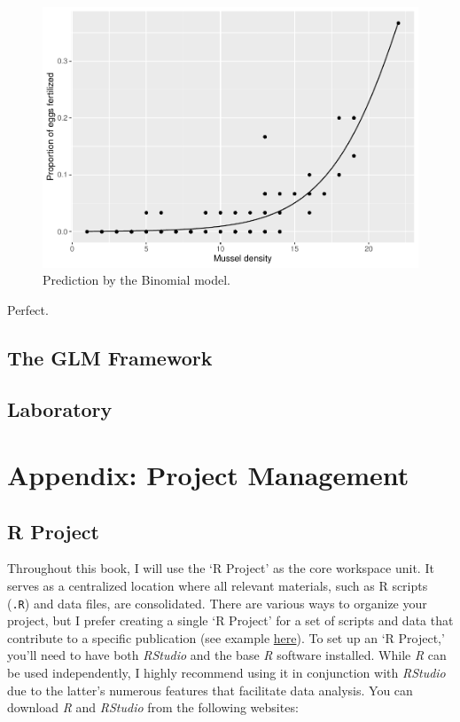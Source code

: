 \documentclass[
]{book}
\begin{document}
\begin{figure}

{\centering \includegraphics{_main_files/figure-latex/binom-fit-figure-1} 

}

\caption{Prediction by the Binomial model.}\label{fig:binom-fit-figure}
\end{figure}

Perfect.

\hypertarget{the-glm-framework}{%
\section{The GLM Framework}\label{the-glm-framework}}

\hypertarget{laboratory-7}{%
\section{Laboratory}\label{laboratory-7}}

\hypertarget{appendix-project-management}{%
\chapter{Appendix: Project Management}\label{appendix-project-management}}

\hypertarget{r-project}{%
\section{R Project}\label{r-project}}

Throughout this book, I will use the `R Project' as the core workspace unit. It serves as a centralized location where all relevant materials, such as R scripts (\texttt{.R}) and data files, are consolidated. There are various ways to organize your project, but I prefer creating a single `R Project' for a set of scripts and data that contribute to a specific publication (see example \href{https://github.com/aterui/public-proj_stream-diversity}{here}). To set up an `R Project,' you'll need to have both \emph{RStudio} and the base \emph{R} software installed. While \emph{R} can be used independently, I highly recommend using it in conjunction with \emph{RStudio} due to the latter's numerous features that facilitate data analysis. You can download \emph{R} and \emph{RStudio} from the following websites:
\end{document}
